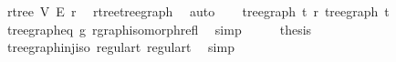 \begin{isabellebody}
\ rtree\ V\ E\ r\ \isamarkupfalse%
\ rtree{\isacharunderscore}{\kern0pt}tree{\isacharunderscore}{\kern0pt}graph\ \isamarkupfalse%
\ auto\isanewline
\ \ \isamarkupfalse%
\ {\isachardoublequoteopen}tree{\isacharunderscore}{\kern0pt}graph\ t{}\ {\isasymsimeq}\isactrlsub r\ tree{\isacharunderscore}{\kern0pt}graph\ t{}{\isachardoublequoteclose}\ \isamarkupfalse%
\ tree{\isacharunderscore}{\kern0pt}graph{\isacharunderscore}{\kern0pt}eq\ g\ rgraph{\isacharunderscore}{\kern0pt}isomorph{\isacharunderscore}{\kern0pt}refl\ \isamarkupfalse%
\ simp\isanewline
\ \ \isamarkupfalse%
\ \isamarkupfalse%
\ {\isacharquery}{\kern0pt}thesis\ \isamarkupfalse%
\ tree{\isacharunderscore}{\kern0pt}graph{\isacharunderscore}{\kern0pt}inj{\isacharunderscore}{\kern0pt}iso\ regular{\isacharunderscore}{\kern0pt}t{}\ regular{\isacharunderscore}{\kern0pt}t{}\ \isamarkupfalse%
\ simp\isanewline
{}\isamarkupfalse%
%
\endisatagproof
{\isafoldproof}%
%
\isadelimproof
\isanewline
%
\endisadelimproof
%
\isadelimtheory
\isanewline
%
\endisadelimtheory
%
\isatagtheory
{}\isamarkupfalse%
%
\endisatagtheory
{\isafoldtheory}%
%
\isadelimtheory
%
\endisadelimtheory
%
\end{isabellebody}%
\endinput
